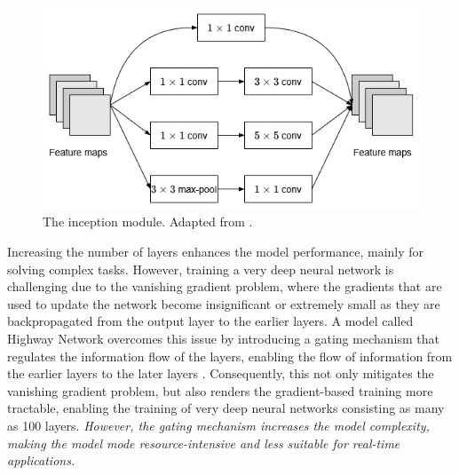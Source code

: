 \documentclass[preprint,12pt]{elsarticle}
\begin{document}
\begin{figure}[h!]
    \centering
    \includegraphics[scale=0.6]{fig_deep_sv_learning_cnn_inception.png}
    \caption{The inception module. Adapted from \citep{szegedy_going_2014}.}
    \label{fig_deep_sv_learning_cnn_inception}
\end{figure}

Increasing the number of layers enhances the model performance, mainly for solving complex tasks. However, training a very deep neural network is challenging due to the vanishing gradient problem, where the gradients that are used to update the network become insignificant or extremely small as they are backpropagated from the output layer to the earlier layers. A model called Highway Network overcomes this issue by introducing a gating mechanism that regulates the information flow of the layers, enabling the flow of information from the earlier layers to the later layers \citep{srivastava_highway_2015}. Consequently, this not only mitigates the vanishing gradient problem, but also renders the gradient-based training more tractable, enabling the training of very deep neural networks consisting as many as 100 layers. \emph{However, the gating mechanism increases the model complexity, making the model mode resource-intensive and less suitable for real-time applications.}
\end{document}
